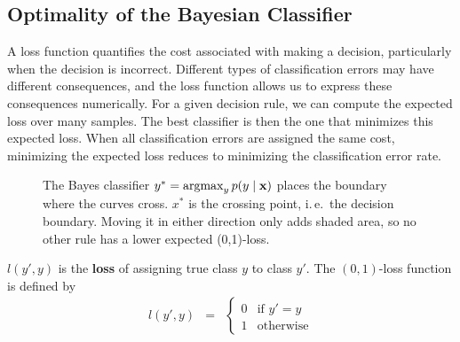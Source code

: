 \subsection{Optimality of the Bayesian Classifier}

A loss function quantifies the cost associated with making a decision, particularly when the decision is incorrect. Different types of classification errors may have different consequences, and the loss function allows us to express these consequences numerically. For a given decision rule, we can compute the expected loss over many samples. The best classifier is then the one that minimizes this expected loss. When all classification errors are assigned the same cost, minimizing the expected loss reduces to minimizing the classification error rate.

\begin{figure}[H]\centering
{}
\caption{The Bayes classifier $y^*=\operatorname*{argmax}_y p(y\mid\bm{\mathrm{x}})$ places the boundary where the curves cross. $x^*$ is the crossing point, i.\,e.\ the decision boundary. Moving it in either direction only adds shaded area, so no other rule has a lower expected (0,1)-loss.}
\end{figure}
	
$l(y',y)$ is the \textbf{loss} of assigning true class $y$ to class $y'$. The $(0,1)$-loss function is defined by
		\begin{eqnarray*}
			l(y',y) &= &\left\{ \begin{array}{ll}
				0 & \text{if } y'=y \\
				1 & \text{otherwise}
			\end{array} \right.
		\end{eqnarray*}


